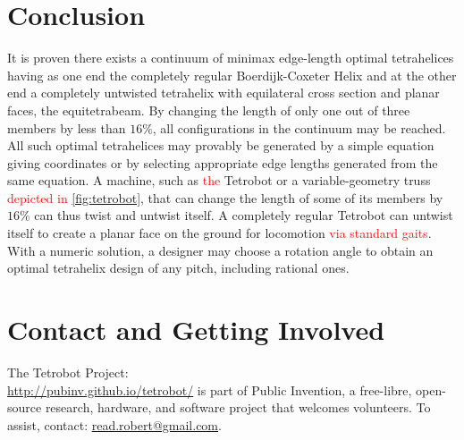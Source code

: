 \documentclass[twocolumn,10pt]{asme2ej}
\newcommand{\highlighttext}[1] {\textcolor{red}{#1}}
\begin{document}
\section{Conclusion}

It is proven there exists a continuum of minimax edge-length optimal tetrahelices
having as one end the completely regular Boerdijk-Coxeter Helix and at the
other end a completely untwisted tetrahelix with equilateral cross
section and planar faces, the equitetrabeam.
By changing the length of only one out of three members by less than $16\%$,
all configurations in the continuum may be reached.
All such optimal tetrahelices may provably be generated by a
simple equation giving coordinates or by
selecting appropriate edge lengths generated from the same equation. 
A machine, such as \highlighttext{the} Tetrobot or a variable-geometry truss \highlighttext{ depicted in \cref{fig:tetrobot}}, that can change
the length of some of its members by $16\%$ can thus twist and untwist itself.
A completely regular Tetrobot can untwist itself to create a planar
face on the ground for locomotion \highlighttext{via standard gaits}.
With a numeric solution, a designer may choose
a rotation angle to obtain an optimal tetrahelix design
of any pitch, including rational ones.

\section{Contact and Getting Involved}

The Tetrobot Project:\\  
\url{http://pubinv.github.io/tetrobot/} is part of Public Invention,
a free-libre, open-source research, hardware, and software project that welcomes volunteers.
To assist, contact:
\href{mailto:read.robert@gmail.com}{read.robert@gmail.com}.



\end{document}
